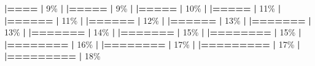 \documentclass[
]{book}
\newenvironment{Shaded}{\begin{snugshade}}{\end{snugshade}}
\newcommand{\DecValTok}[1]{\textcolor[rgb]{0.00,0.00,0.81}{#1}}
\newcommand{\ErrorTok}[1]{\textcolor[rgb]{0.64,0.00,0.00}{\textbf{#1}}}
\newcommand{\NormalTok}[1]{#1}
\newcommand{\SpecialCharTok}[1]{\textcolor[rgb]{0.81,0.36,0.00}{\textbf{#1}}}
\begin{document}
\begin{Shaded}
\begin{Highlighting}[]
  \ErrorTok{|====}                                              \ErrorTok{|}   \DecValTok{9}\NormalTok{\%}
  \SpecialCharTok{|}                                                        
  \ErrorTok{|=====}                                             \ErrorTok{|}   \DecValTok{9}\NormalTok{\%}
  \SpecialCharTok{|}                                                        
  \ErrorTok{|=====}                                             \ErrorTok{|}  \DecValTok{10}\NormalTok{\%}
  \SpecialCharTok{|}                                                        
  \ErrorTok{|=====}                                             \ErrorTok{|}  \DecValTok{11}\NormalTok{\%}
  \SpecialCharTok{|}                                                        
  \ErrorTok{|======}                                            \ErrorTok{|}  \DecValTok{11}\NormalTok{\%}
  \SpecialCharTok{|}                                                        
  \ErrorTok{|======}                                            \ErrorTok{|}  \DecValTok{12}\NormalTok{\%}
  \SpecialCharTok{|}                                                        
  \ErrorTok{|======}                                            \ErrorTok{|}  \DecValTok{13}\NormalTok{\%}
  \SpecialCharTok{|}                                                        
  \ErrorTok{|=======}                                           \ErrorTok{|}  \DecValTok{13}\NormalTok{\%}
  \SpecialCharTok{|}                                                        
  \ErrorTok{|=======}                                           \ErrorTok{|}  \DecValTok{14}\NormalTok{\%}
  \SpecialCharTok{|}                                                        
  \ErrorTok{|=======}                                           \ErrorTok{|}  \DecValTok{15}\NormalTok{\%}
  \SpecialCharTok{|}                                                        
  \ErrorTok{|========}                                          \ErrorTok{|}  \DecValTok{15}\NormalTok{\%}
  \SpecialCharTok{|}                                                        
  \ErrorTok{|========}                                          \ErrorTok{|}  \DecValTok{16}\NormalTok{\%}
  \SpecialCharTok{|}                                                        
  \ErrorTok{|========}                                          \ErrorTok{|}  \DecValTok{17}\NormalTok{\%}
  \SpecialCharTok{|}                                                        
  \ErrorTok{|=========}                                         \ErrorTok{|}  \DecValTok{17}\NormalTok{\%}
  \SpecialCharTok{|}                                                        
  \ErrorTok{|=========}                                         \ErrorTok{|}  \DecValTok{18}\NormalTok{\%}

\end{Highlighting}
\end{Shaded}
\end{document}

